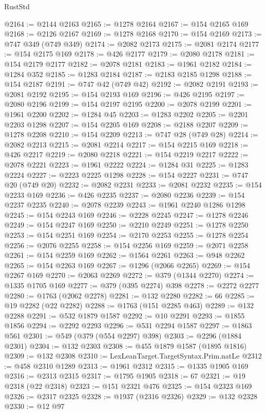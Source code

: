 \begin{lexlean}{RustStd}
\begin{coremodule}
@2164 := @2144 @2163
@2165 := @1278 @2164
@2167 := @154 @2165 @169
@2168 := @2126 @2167
@2169 := @1278 @2168
@2170 := @154 @2169
@2173 := @747 @349 (@749 @349)
@2174 := @2082 @2173
@2175 := @2081 @2174
@2177 := @154 @2175 @169
@2178 := @426 @2177
@2179 := @2080 @2178
@2181 := @154 @2179 @2177
@2182 := @2078 @2181
@2183 := @1961 @2182
@2184 := @1284 @352
@2185 := @1283 @2184
@2187 := @2183 @2185 @1298
@2188 := @154 @2187
@2191 := @747 @42 (@749 @42)
@2192 := @2082 @2191
@2193 := @2081 @2192
@2195 := @154 @2193 @169
@2196 := @426 @2195
@2197 := @2080 @2196
@2199 := @154 @2197 @2195
@2200 := @2078 @2199
@2201 := @1961 @2200
@2202 := @1284 @45
@2203 := @1283 @2202
@2205 := @2201 @2203 @1298
@2207 := @154 @2205 @169
@2208 := @2188 @2207
@2209 := @1278 @2208
@2210 := @154 @2209
@2213 := @747 @28 (@749 @28)
@2214 := @2082 @2213
@2215 := @2081 @2214
@2217 := @154 @2215 @169
@2218 := @426 @2217
@2219 := @2080 @2218
@2221 := @154 @2219 @2217
@2222 := @2078 @2221
@2223 := @1961 @2222
@2224 := @1284 @31
@2225 := @1283 @2224
@2227 := @2223 @2225 @1298
@2228 := @154 @2227
@2231 := @747 @20 (@749 @20)
@2232 := @2082 @2231
@2233 := @2081 @2232
@2235 := @154 @2233 @169
@2236 := @426 @2235
@2237 := @2080 @2236
@2239 := @154 @2237 @2235
@2240 := @2078 @2239
@2243 := @1961 @2240 @1286 @1298
@2245 := @154 @2243 @169
@2246 := @2228 @2245
@2247 := @1278 @2246
@2249 := @154 @2247 @169
@2250 := @2210 @2249
@2251 := @1278 @2250
@2253 := @154 @2251 @169
@2254 := @2170 @2253
@2255 := @1278 @2254
@2256 := @2076 @2255
@2258 := @154 @2256 @169
@2259 := @2071 @2258
@2261 := @154 @2259 @169
@2262 := @1564 @2261
@2263 := @948 @2262
@2265 := @154 @2263 @169
@2267 := @1296 (@2066 @2265)
@2269 := @154 @2267 @169
@2270 := @2063 @2269
@2272 := @379 (@1344 @2270)
@2274 := @1335 @1705 @169
@2277 := @379 (@395 @2274) @398
@2278 := @2272 @2277
@2280 := @1763 (@2062 @2278)
@2281 := @132 @2280
@2282 := 66
@2285 := @19 @2282 (@22 @2282)
@2288 := @1763 (@151 @2285 @463)
@2289 := @132 @2288
@2291 := @532 @1879 @1587
@2292 := @10 @2291
@2293 := @1855 @1856
@2294 := @2292 @2293
@2296 := @531 @2294 @1587
@2297 := @1863 @561
@2301 := @549 (@379 (@554 @2297) @398)
@2303 := @2296 (@1884 @2301)
@2304 := @132 @2303
@2308 := @455 @1879 @1587 (@1895 @1816)
@2309 := @132 @2308
@2310 := LexLeanTarget.TargetSyntax.Prim.natLe
@2312 := @458 @2310 @1289
@2313 := @1961 @2312
@2315 := @1335 @1905 @169
@2316 := @2313 @2315
@2317 := @1795 @1905
@2318 := 67
@2321 := @19 @2318 (@22 @2318)
@2323 := @151 @2321 @476
@2325 := @154 @2323 @169
@2326 := @2317 @2325
@2328 := @1937 (@2316 @2326)
@2329 := @132 @2328
@2330 := @12 @97

\end{coremodule}
\end{lexlean}
